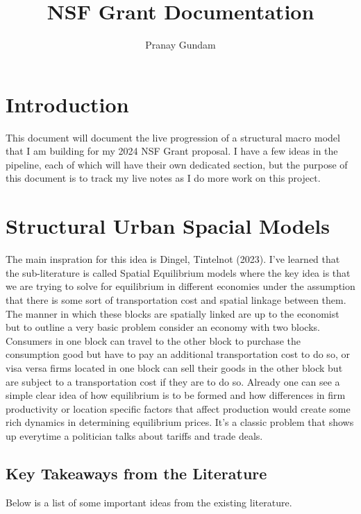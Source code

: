 \documentclass[11pt,english]{article}
\title{\textbf{NSF Grant Documentation}}
\author{Pranay Gundam}
\begin{document}
\maketitle


\tableofcontents


\section{Introduction}

This document will document the live progression of a structural macro model that I am building for my 2024 NSF Grant proposal. I have a few ideas in the pipeline, each of which will have their own dedicated section, but the purpose of this document is to track my live notes as I do more work on this project.

\section{Structural Urban Spacial Models}

The main inspration for this idea is Dingel, Tintelnot (2023)\cite{Dingel2023}. I've learned that the sub-literature is called Spatial Equilibrium models where the key idea is that we are trying to solve for equilibrium in different economies under the assumption that there is some sort of transportation cost and spatial linkage between them. The manner in which these blocks are spatially linked are up to the economist but to outline a very basic problem consider an economy with two blocks. Consumers in one block can travel to the other block to purchase the consumption good but have to pay an additional transportation cost to do so, or visa versa firms located in one block can sell their goods in the other block but are subject to a transportation cost if they are to do so. Already one can see a simple clear idea of how equilibrium is to be formed and how differences in firm productivity or location specific factors that affect production would create some rich dynamics in determining equilibrium prices. It's a classic problem that shows up everytime a politician talks about tariffs and trade deals.

\subsection{Key Takeaways from the Literature}

Below is a list of some important ideas from the existing literature.
\end{document}
